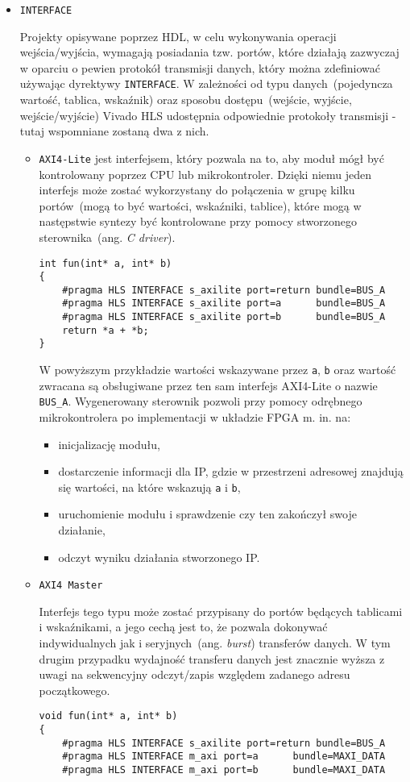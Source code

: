 \begin{itemize}
\item \texttt{INTERFACE}

Projekty opisywane poprzez HDL, w celu wykonywania operacji wejścia/wyjścia, wymagają posiadania tzw. portów, które działają zazwyczaj w oparciu o pewien protokół transmisji danych, który można zdefiniować używając dyrektywy \texttt{INTERFACE}. W zależności od typu danych~(pojedyncza wartość, tablica, wskaźnik) oraz sposobu dostępu~(wejście, wyjście, wejście/wyjście) Vivado HLS udostępnia odpowiednie protokoły transmisji - tutaj wspomniane zostaną dwa z nich.
\begin{itemize}
\item \texttt{AXI4-Lite} jest interfejsem, który pozwala na to, aby moduł mógł być kontrolowany poprzez CPU lub mikrokontroler. Dzięki niemu jeden interfejs może zostać wykorzystany do połączenia w grupę kilku portów~(mogą to być wartości, wskaźniki, tablice), które mogą w następstwie syntezy być kontrolowane przy pomocy stworzonego sterownika~(ang. \textit{C driver}). 
\begin{lstlisting}[caption=Przykład użycia interfejsu AXI4-Lite]
int fun(int* a, int* b)
{
	#pragma HLS INTERFACE s_axilite port=return bundle=BUS_A
	#pragma HLS INTERFACE s_axilite port=a 		bundle=BUS_A
	#pragma HLS INTERFACE s_axilite port=b 		bundle=BUS_A
	return *a + *b;
}
\end{lstlisting}
W powyższym przykładzie wartości wskazywane przez \texttt{a}, \texttt{b} oraz wartość zwracana są obsługiwane przez ten sam interfejs AXI4-Lite o nazwie \texttt{BUS\_A}. Wygenerowany sterownik pozwoli przy pomocy odrębnego mikrokontrolera po implementacji w układzie FPGA m. in. na:
\begin{itemize}
\item inicjalizację modułu,
\item dostarczenie informacji dla IP, gdzie w przestrzeni adresowej znajdują się wartości, na które wskazują \texttt{a} i \texttt{b},
\item uruchomienie modułu i sprawdzenie czy ten zakończył swoje działanie,
\item odczyt wyniku działania stworzonego IP.
\end{itemize}
\item \texttt{AXI4 Master}

Interfejs tego typu może zostać przypisany do portów będących tablicami i wskaźnikami, a jego cechą jest to, że pozwala dokonywać indywidualnych jak i seryjnych~(ang. \textit{burst}) transferów danych. W tym drugim przypadku wydajność transferu danych jest znacznie wyższa z uwagi na sekwencyjny odczyt/zapis względem zadanego adresu początkowego.
\begin{lstlisting}[caption=Przykład użycia interfejsu AXI4 Master z seryjnym dostępem do danych. Zmiana adresów wskazywanych umożliwiona została poprzez interfejs AXI4-Lite]
void fun(int* a, int* b)
{
	#pragma HLS INTERFACE s_axilite port=return bundle=BUS_A
	#pragma HLS INTERFACE m_axi port=a 		bundle=MAXI_DATA
	#pragma HLS INTERFACE m_axi port=b 		bundle=MAXI_DATA


\end{lstlisting}
\end{itemize}
\end{itemize}
